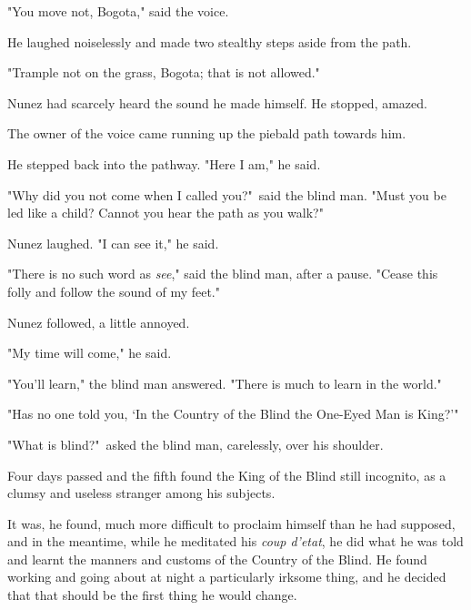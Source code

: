 \documentclass[courier]{sffms}
\begin{document}
"You move not, Bogota," said the voice.

He laughed noiselessly and made two stealthy steps aside from the
path.

"Trample not on the grass, Bogota; that is not allowed."

Nunez had scarcely heard the sound he made himself. He stopped,
amazed.

The owner of the voice came running up the piebald path towards him.

He stepped back into the pathway. "Here I am," he said.

"Why did you not come when I called you?"\ said the blind man. "Must
you be led like a child? Cannot you hear the path as you walk?"

Nunez laughed. "I can see it," he said.

"There is no such word as \emph{see}," said the blind man, after a
pause. "Cease this folly and follow the sound of my feet."

Nunez followed, a little annoyed.

"My time will come," he said.

"You'll learn," the blind man answered. "There is much to learn in the
world."

"Has no one told you, `In the Country of the Blind the One-Eyed Man is
King?'"

"What is blind?"\ asked the blind man, carelessly, over his shoulder.

Four days passed and the fifth found the King of the Blind still
incognito, as a clumsy and useless stranger among his subjects.

It was, he found, much more difficult to proclaim himself than he had
supposed, and in the meantime, while he meditated his \emph{coup d'etat}, he
did what he was told and learnt the manners and customs of the Country
of the Blind. He found working and going about at night a particularly
irksome thing, and he decided that that should be the first thing he
would change.
\end{document}
